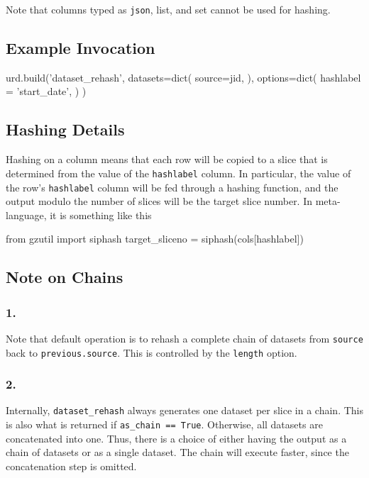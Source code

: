 \noindent Note that columns typed as \texttt{json}, list, and set cannot be used
for hashing.


\subsection{Example Invocation}
\begin{python}
urd.build('dataset_rehash',
  datasets=dict(
    source=jid,
  ), 
  options=dict(
    hashlabel = 'start_date',
  )
)
\end{python}



\subsection{Hashing Details}
Hashing on a column means that each row will be copied to a slice that
is determined from the value of the \texttt{hashlabel} column.  In
particular, the value of the row's \texttt{hashlabel} column will be
fed through a hashing function, and the output modulo the number of
slices will be the target slice number.  In meta-language, it is
something like this
\\
\begin{python}
from gzutil import siphash
target_sliceno = siphash(cols[hashlabel])
\end{python}



\subsection{Note on Chains}
\subsubsection{1.}
Note that default operation is to rehash a complete chain of datasets
from \texttt{source} back to \texttt{previous.source}.  This is
controlled by the \texttt{length} option.

\subsubsection{2.}
Internally, \texttt{dataset\_rehash} always generates one dataset per
slice in a chain.  This is also what is returned if \texttt{as\_chain
  == True}.  Otherwise, all datasets are concatenated into one.  Thus,
there is a choice of either having the output as a chain of datasets
or as a single dataset.  The chain will execute faster, since the
concatenation step is omitted.


